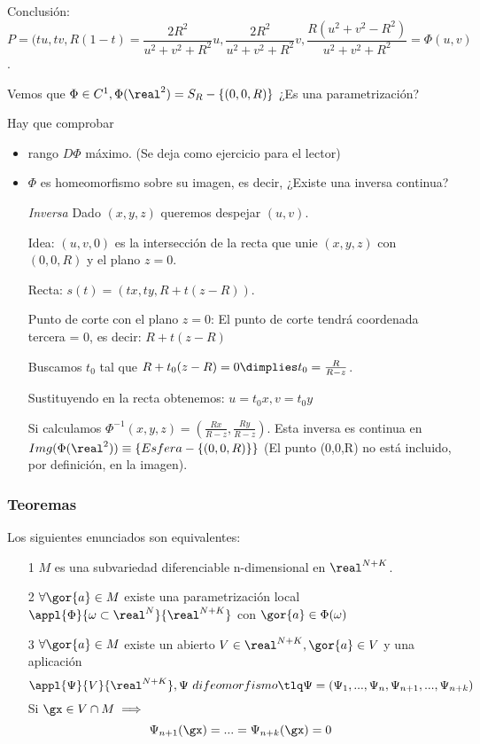  Conclusión: \[P = (tu,tv,R(1-t) = \frac{2R^2}{u^2+v^2+R^2}u,\frac{2R^2}{u^2+v^2+R^2}v,\frac{R(u^2+v^2-R^2)}{u^2+v^2+R^2} = \Phi(u,v)\].
 
 Vemos que $\Phi\in C^1, \Phi(\real^2) = S_R-\{(0,0,R)\}$ ¿Es una parametrización?
 
 Hay que comprobar \begin{itemize}
 \item rango $D\Phi$ máximo. (Se deja como ejercicio para el lector)
 \item $\Phi$ es homeomorfismo sobre su imagen, es decir, ¿Existe una inversa continua? 
 
 \emph{Inversa}
 Dado $(x,y,z)$ queremos despejar $(u,v)$.
 
 Idea: $(u,v,0)$ es la intersección de la recta que unie $(x,y,z)$ con $(0,0,R)$ y el plano $z=0$.
 
 Recta: $s(t) = (tx,ty,R+t(z-R))$.
 
 Punto de corte con el plano $z=0$: El punto de corte tendrá coordenada tercera = 0, es decir: 
 $R+t(z-R)$
 
 Buscamos $t_0$ tal que $R+t_0(z-R)=0 \dimplies t_0=\frac{R}{R-z}$.
 
 Sustituyendo en la recta obtenemos: $u = t_0x, v=t_0y$
 
 Si calculamos $\Phi^{-1}(x,y,z) = \left(\frac{Rx}{R-z},\frac{Ry}{R-z}\right)$. Esta inversa es continua en $Img(\Phi(\real^2)) \equiv \{Esfera - \{(0,0,R)\}\}$  (El punto (0,0,R) no está incluido, por definición, en la imagen).
 
 \end{itemize}
\subsubsection{Teoremas}
\begin{theorem}
Los siguientes enunciados son equivalentes:
\begin{itemize}
\item[1] $M$ es una subvariedad diferenciable n-dimensional en $\real^{N+K}$. \label{eq_1}
\item[2] $\forall \gor{a} \in M $ existe una parametrización local $\appl{\Phi}{\omega\subset \real^N}{\real^{N+K}}$ con $\gor{a}\in \Phi(\omega)$\label{eq_2}
\item[3] $\forall \gor{a} \in M$ existe un abierto $V\in \real^{N+K}, \gor{a}\in V$ y una aplicación 
\label{eq_3}
\[\appl{\Psi}{V}{\real^{N+K}}, \Psi\ difeomorfismo \tlq \Psi = (\Psi_1,...,\Psi_n,\Psi_{n+1},...,\Psi_{n+k})\]
Si $\gx \in V\cap M \implies$
\[\Psi_{n+1}(\gx) = ... = \Psi_{n+k}(\gx) = 0\]
\end{itemize}
\end{theorem}
 

